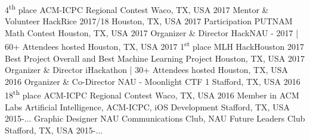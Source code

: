 \begin{cvhonors}
  \cvhonor
   	{4\textsuperscript{th} place}
   	{ACM-ICPC Regional Contest}
    {Waco, TX, USA}
    {2017}
  \cvhonor
   	{Mentor \& Volunteer}
   	{HackRice 2017/18}
    {Houston, TX, USA}
    {2017}
  \cvhonor
   	{Participation}
   	{PUTNAM Math Contest}
    {Houston, TX, USA}
    {2017}
  \cvhonor
    {Organizer \& Director}
    {HackNAU - 2017 | 60+ Attendees hosted}
    {Houston, TX, USA}
    {2017} 
  \cvhonor
    {1\textsuperscript{st} place}
    {MLH HackHouston 2017 Best Project Overall and Best Machine Learning Project}
    {Houston, TX, USA}
    {2017} 
  \cvhonor
    {Organizer \& Director}
    {iHackathon | 30+ Attendees hosted}
    {Houston, TX, USA}
    {2016}
  \cvhonor
    {Organizer \& Co-Director}
    {NAU - Moonlight CTF 1}
    {Stafford, TX, USA}
    {2016} 
   \cvhonor
   	{18\textsuperscript{th} place}
   	{ACM-ICPC Regional Contest}
    {Waco, TX, USA}
    {2016}
   \cvhonor
    {Member in ACM Labs}
    {Artificial Intelligence, ACM-ICPC, iOS Development}
    {Stafford, TX, USA}
    {2015-...}
   \cvhonor
    {Graphic Designer}
    {NAU Communications Club, NAU Future Leaders Club}
    {Stafford, TX, USA}
    {2015-...} 
   
    
   
\end{cvhonors}

